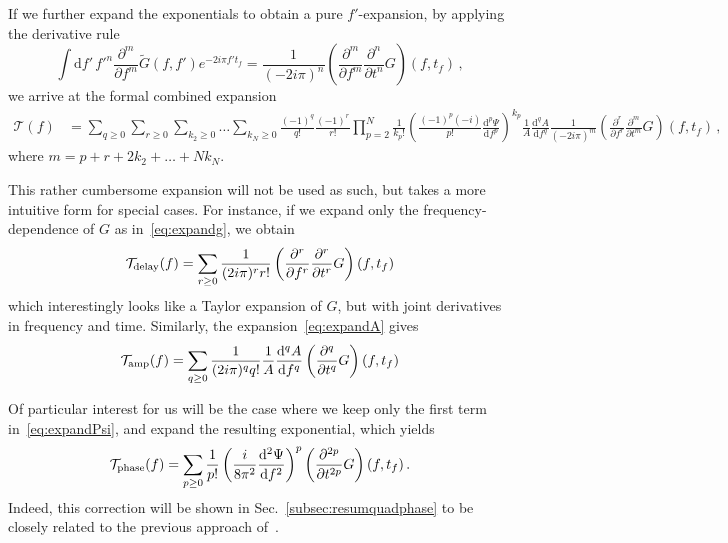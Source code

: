 \documentclass[aps,showpacs,twocolumn,
prd,superscriptaddress,nofootinbib]{revtex4-1}
\newcommand{\be}{\begin{equation}}
\newcommand{\ee}{\end{equation}}
\newcommand\ud{{\mathrm{d}}}
\newcommand\calT{{\mathcal{T}}}
\newcommand{\tf}{t_{f}}
\begin{document}
\begin{widetext}
If we further expand the exponentials to obtain a pure $f'$-expansion, by applying the derivative rule
\allowdisplaybreaks
\be
	\int \ud f'\, {f'}^{n} \frac{\partial^{m} }{\partial f^{m}}  \tilde{G}(f,f') e^{-2i\pi f' \tf} = \frac{1}{(-2i\pi)^{n}} \left( \frac{\partial^{m} }{\partial f^{m}} \frac{\partial^{n} }{\partial t^{n}} G \right)(f,\tf) \,,
\ee
we arrive at the formal combined expansion
\begin{align}
	\calT(f) &= \sum\limits_{q\geq 0} \sum\limits_{r\geq 0} \sum\limits_{k_{2}\geq 0} \dots \sum\limits_{k_{N}\geq 0} \frac{(-1)^{q}}{q!} \frac{(-1)^{r}}{r!} \prod\limits_{p=2}^{N} \frac{1}{k_{p}!}\left( \frac{(-1)^{p}(-i)}{p!} \frac{\ud^{p}\Psi}{\ud f^{p}}\right)^{k_{p}} \frac{1}{A} \frac{\ud^{q} A}{\ud f ^{q}} \frac{1}{(-2i\pi)^m} \left( \frac{\partial^{r} }{\partial f^{r}} \frac{\partial^{m} }{\partial t^{m}} G \right)(f,\tf) \,,
\end{align}
where $m = p+r+2k_{2}+\dots+N k_{N}$.
\end{widetext}

This rather cumbersome expansion will not be used as such, but takes a more intuitive form for special cases. For instance, if we expand only the frequency-dependence of $G$ as in~\eqref{eq:expandg}, we obtain
\be\label{eq:taylordelay}
	\calT_{\rm delay}(f) = \sum\limits_{r\geq 0} \frac{1}{(2i\pi)^{r}r!} \left( \frac{\partial^{r} }{\partial f^{r}} \frac{\partial^{r} }{\partial t^{r}} G \right)(f,\tf)
\ee
which interestingly looks like a Taylor expansion of $G$, but with joint derivatives in frequency and time. Similarly, the expansion~\eqref{eq:expandA} gives
\be\label{eq:resultdfA}
	\calT_{\rm amp}(f) = \sum\limits_{q\geq 0} \frac{1}{(2i\pi)^{q}q!} \frac{1}{A} \frac{\ud^{q} A}{\ud f ^{q}}  \left( \frac{\partial^{q} }{\partial t^{q}} G \right)(f,\tf)
\ee

Of particular interest for us will be the case where we keep only the first term in~\eqref{eq:expandPsi}, and expand the resulting exponential, which yields
\be\label{eq:resultdffPsi}
	\calT_{\rm phase}(f) = \sum\limits_{p\geq 0} \frac{1}{p!} \left( \frac{i}{8\pi^{2}}\frac{\ud^{2} \Psi}{\ud f^{2}} \right)^{p} \left( \frac{\partial^{2p} }{\partial t^{2p}} G \right)(f, \tf) \,.
\ee
Indeed, this correction will be shown in Sec.~\ref{subsec:resumquadphase} to be closely related to the previous approach of~\cite{KCY14}.
\end{document}
